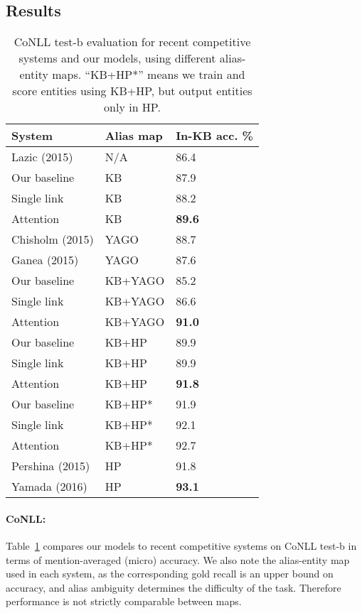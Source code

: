 \subsection{Results}
\begin{table}[t!]
  \centering
  \begin{tabular}{l|l|l}
    System                 &  Alias map  & In-KB acc. \% \\
    \hline
    Lazic (2015)    & N/A          & 86.4 \\
    \hline
    Our baseline    & KB           & 87.9  \\
    Single link     & KB           & 88.2 \\
    Attention       & KB           & \textbf{89.6} \\
    \hline
    Chisholm (2015) & YAGO         & 88.7 \\
    Ganea (2015)    & YAGO         & 87.6 \\
    Our baseline    & KB+YAGO      & 85.2 \\
    Single link     & KB+YAGO      & 86.6 \\
    Attention       & KB+YAGO      & {\bf 91.0} \\
    \hline
    Our baseline    & KB+HP        & 89.9 \\
    Single link & KB+HP & 89.9 \\
    Attention       & KB+HP        & {\bf 91.8} \\
    \hline \hline
    Our baseline &KB+HP* & 91.9 \\
    Single link     & KB+HP*       & 92.1 \\
    Attention       & KB+HP*       & {92.7} \\ \hline
    Pershina (2015) & HP           & 91.8 \\
    Yamada (2016) & HP & {\bf 93.1}
  \end{tabular}
\caption{CoNLL test-b evaluation for recent competitive systems and
  our models, using different alias-entity maps.  ``KB+HP*'' means we
  train and score entities using KB+HP, but output entities only in
  HP.}
 \label{table:conll_results} 
\end{table}

\paragraph*{CoNLL:}
Table~\ref{table:conll_results} compares our models to recent
competitive systems on CoNLL test-b in terms of mention-averaged (micro)
accuracy.  We also note the alias-entity map used in each
system, as the corresponding gold recall is an upper bound on
accuracy, and alias ambiguity determines the difficulty of the task.
Therefore performance is not strictly comparable between maps.

